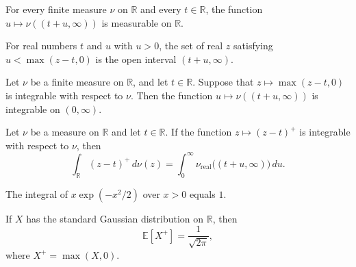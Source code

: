 \begin{theorem}
\label{FABL.measurable_upperTailFrom}
\leanok
{}
For every finite measure $\nu$ on $\mathbb{R}$ and every $t\in\mathbb{R}$, the function
$u\mapsto \nu((t+u,\infty))$ is measurable on $\mathbb{R}$.
\end{theorem}

\begin{theorem}
\label{FABL.setOf_lt_posPart_sub_eq_Ioi_add}
\leanok
{}
For real numbers $t$ and $u$ with $u>0$, the set of real $z$ satisfying $u<\max(z-t,0)$
is the open interval $(t+u,\infty)$.
\end{theorem}

\begin{theorem}
\label{FABL.integrableOn_upperTailFrom}
\leanok
{}
Let $\nu$ be a finite measure on $\mathbb{R}$, and let $t\in\mathbb{R}$. Suppose that
$z\mapsto\max(z-t,0)$ is integrable with respect to $\nu$. Then the function
$u\mapsto\nu((t+u,\infty))$ is integrable on $(0,\infty)$.
\end{theorem}

\begin{theorem}
\label{FABL.integral_posPart_sub_eq_integral_upperTailFrom}
\leanok
{}
Let $\nu$ be a measure on $\mathbb R$ and let $t\in\mathbb R$. If the function
$z\mapsto(z-t)^+$ is integrable with respect to $\nu$, then
\[\int_{\mathbb R}(z-t)^+\,d\nu(z)=\int_0^\infty \nu_{\mathrm{real}}\bigl((t+u,\infty)\bigr)\,du.\]
\end{theorem}

\begin{theorem}
\label{FABL.integral_Ioi_mul_exp_neg_sq_div_two}
\leanok
{}
The integral of $x\exp(-x^2/2)$ over $x>0$ equals $1$.
\end{theorem}

\begin{theorem}
\label{FABL.integral_posPart_standardGaussian}
\leanok
{}
If $X$ has the standard Gaussian distribution on $\mathbb R$, then
\[\mathbb E[X^+]=\frac{1}{\sqrt{2\pi}},\]
where $X^+=\max(X,0)$.
\end{theorem}

